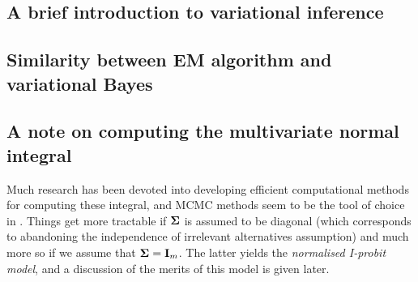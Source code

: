 \subsection{A brief introduction to variational inference}

\subsection{Similarity between EM algorithm and variational Bayes}


\subsection{A note on computing the multivariate normal integral}
\label{misc:mnint}


Much research has been devoted into developing efficient computational methods for computing these integral, and MCMC methods seem to be the tool of choice in \citep{mcculloch1994exact,nobile1998hybrid,mcculloch2000bayesian}.
Things get more tractable if ${\bm\Sigma}$ is assumed to be diagonal (which corresponds to abandoning the independence of irrelevant alternatives assumption) and much more so if we assume that ${\bm\Sigma} = {\mathbf I}_m$.
The latter yields the \emph{normalised I-probit model}, and a discussion of the merits of this model is given later.








